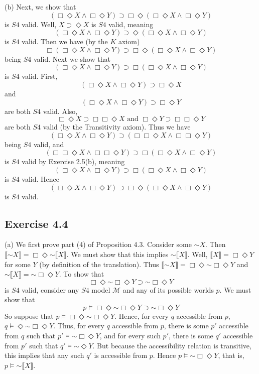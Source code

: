 \documentclass{article}
\newcommand*{\oldneg}{\mathord{\sim}}
\theoremstyle{definition}
\begin{document}
(b) Next, we show that
\[ (\Box\Diamond X\wedge\Box\Diamond Y)\supset\Box\Diamond(\Box\Diamond X\wedge\Box\Diamond Y) \]
is $S4$ valid. Well, $X\supset\Diamond X$ is $S4$ valid, meaning
\[ (\Box\Diamond X\wedge\Box\Diamond Y)\supset\Diamond(\Box\Diamond X\wedge\Box\Diamond Y) \]
is $S4$ valid. Then we have (by the $K$ axiom)
\[ \Box(\Box\Diamond X\wedge\Box\Diamond Y)\supset\Box\Diamond(\Box\Diamond X\wedge\Box\Diamond Y) \]
being $S4$ valid.
Next we show that
\[ (\Box\Diamond X\wedge\Box\Diamond Y)\supset\Box(\Box\Diamond X\wedge\Box\Diamond Y) \]
is $S4$ valid. First,
\[ (\Box\Diamond X\wedge\Box\Diamond Y)\supset\Box\Diamond X \]
and
\[ (\Box\Diamond X\wedge\Box\Diamond Y)\supset\Box\Diamond Y \]
are both $S4$ valid. Also,
\[ \Box\Diamond X\supset\Box\Box\Diamond X\textrm{ and }\Box\Diamond Y\supset\Box\Box\Diamond Y \]
are both $S4$ valid (by the Transitivity axiom). Thus we have
\[ (\Box\Diamond X\wedge\Box\Diamond Y)\supset(\Box\Box\Diamond X\wedge\Box\Box\Diamond Y) \]
being $S4$ valid,
and 
\[ (\Box\Box\Diamond X\wedge\Box\Box\Diamond Y)\supset\Box(\Box\Diamond X\wedge\Box\Diamond Y) \]
is $S4$ valid by Exercise 2.5(b), meaning
\[ (\Box\Diamond X\wedge\Box\Diamond Y)\supset\Box(\Box\Diamond X\wedge\Box\Diamond Y) \]
is $S4$ valid.
Hence
\[ (\Box\Diamond X\wedge\Box\Diamond Y)\supset\Box\Diamond(\Box\Diamond X\wedge\Box\Diamond Y) \]
is $S4$ valid.

\subsection*{Exercise 4.4}
(a) We first prove part (4) of Proposition 4.3. Consider some $\oldneg X$. Then 
$\llbracket\oldneg X\rrbracket=\Box\Diamond\oldneg\llbracket X\rrbracket$. We must show that this implies
$\oldneg\llbracket X\rrbracket$. Well, $\llbracket X\rrbracket=\Box\Diamond Y$ for some $Y$ (by 
definition of the translation). Thus
$\llbracket\oldneg X\rrbracket=\Box\Diamond\oldneg\Box\Diamond Y$ and 
$\oldneg\llbracket X\rrbracket=\oldneg\Box\Diamond Y$.
To show that
\[ \Box\Diamond\oldneg\Box\Diamond Y\supset\oldneg\Box\Diamond Y \]
is $S4$ valid, consider any $S4$ model $\mathcal{M}$ and any of its possible worlds $p$. We must show that
\[ p\vDash\Box\Diamond\oldneg\Box\Diamond Y\supset\oldneg\Box\Diamond Y \]
So suppose that $p\vDash\Box\Diamond\oldneg\Box\Diamond Y$. Hence, for every 
$q$ accessible from $p$, $q\vDash\Diamond\oldneg\Box\Diamond Y$. Thus, for every 
$q$ accessible from $p$, there is some $p'$ accessible from $q$ such that $p'\vDash\oldneg\Box\Diamond Y$, and 
for every such $p'$, there is some $q'$ accessible from $p'$ such that $q'\vDash\oldneg\Diamond Y$. But because 
the accessibility relation is transitive, this implies that any such $q'$ is accessible from $p$. Hence
$p\vDash\oldneg\Box\Diamond Y$, that is, $p\vDash\oldneg\llbracket X\rrbracket$.
\end{document}
